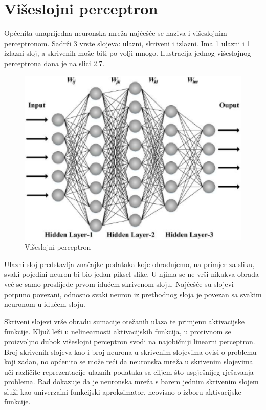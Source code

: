 \documentclass[times, utf8, diplomski]{fer}
\begin{document}
\section{Višeslojni perceptron}
Općenita unaprijedna neuronska mreža najčešće se naziva i višeslojnim perceptronom. Sadrži 3 vrste slojeva: ulazni, skriveni i izlazni. Ima 1 ulazni i 1 izlazni sloj, a skrivenih može biti po volji mnogo. Ilustracija jednog višeslojnog perceptrona dana je na slici 2.7.

\begin{figure}[htbp]
    \centering
    \includegraphics[scale=0.4]{Slike/mlp}
    \caption{Višeslojni perceptron \cite{mlp}}
\end{figure}

Ulazni sloj predstavlja značajke podataka koje obrađujemo, na primjer za sliku, svaki pojedini neuron bi bio jedan piksel slike. U njima se ne vrši nikakva obrada već se samo proslijede prvom idućem skrivenom sloju. Najčešće su slojevi potpuno povezani, odnosno svaki neuron iz prethodnog sloja je povezan sa svakim neuronom u idućem sloju. \par

Skriveni slojevi vrše obradu sumacije otežanih ulaza te primjenu aktivacijske funkcije. Ključ leži u nelinearnosti aktivacijskih funkcija, u protivnom se proizvoljno dubok višeslojni perceptron svodi na najobičniji linearni perceptron. Broj skrivenih slojeva kao i broj neurona u skrivenim slojevima ovisi o problemu koji zadan, no općenito se može reći da neuronska mreža u skrivenim slojevima uči različite reprezentacije ulaznih podataka sa ciljem što uspješnijeg rješavanja problema. Rad \cite{hornik} dokazuje da je neuronska mreža s barem jednim skrivenim slojem služi kao univerzalni funkcijski aproksimator, neovisno o izboru aktivacijske funkcije.\par
\end{document}
